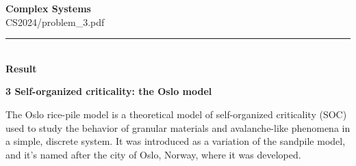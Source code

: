 \documentclass[10pt,letterpaper, onecolumn]{report}
\begin{document}
\begingroup
    \centering
    \LARGE \textbf{Complex Systems} \\
    \large CS2024/problem\_3.pdf \\[0.5em]
\endgroup

\begin{flushleft}
    \rule{\textwidth}{0.4pt} \\ %
    \textbf{Result} %
\end{flushleft}

\begin{flushleft}
    \textbf{3 Self-organized criticality: the Oslo model}
    \hfill\break
    \setlength{\parindent}{1.5em} %
    \setlength{\parskip}{0.5em}   %

    The Oslo rice-pile model is a theoretical model of self-organized criticality (SOC) used to study
    the behavior of granular materials and avalanche-like phenomena in a simple, discrete system. It was
    introduced as a variation of the sandpile model, and it's named after the city of Oslo, Norway, where it
    was developed.
\end{flushleft}
\end{document}

